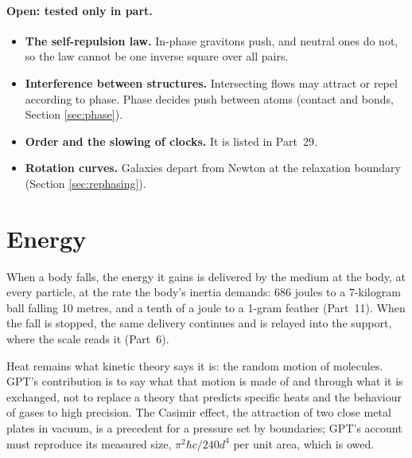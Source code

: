 \documentclass[11pt,a4paper]{article}
\begin{document}
\paragraph{Open: tested only in part.}
\begin{itemize}
\item \textbf{The self-repulsion law.} In-phase gravitons push, and neutral ones do not, so the law cannot be one inverse square over all pairs. 
\item \textbf{Interference between structures.} Intersecting flows may attract or repel according to phase. Phase decides push between atoms (contact and bonds, Section \ref{sec:phase}). 
\item \textbf{Order and the slowing of clocks.}  It is listed in Part~29.
\item \textbf{Rotation curves.} Galaxies depart from Newton at the relaxation boundary (Section \ref{sec:rephasing}). 
\end{itemize}

\section{Energy}
\label{sec:energy}

 When a body falls, the energy it gains is delivered by the medium at the body, at every particle, at the rate the body's inertia demands: 686 joules to a 7-kilogram ball falling 10 metres, and a tenth of a joule to a 1-gram feather (Part~11). When the fall is stopped, the same delivery continues and is relayed into the support, where the scale reads it (Part~6).

Heat remains what kinetic theory says it is: the random motion of molecules. GPT's contribution is to say what that motion is made of and through what it is exchanged, not to replace a theory that predicts specific heats and the behaviour of gases to high precision. The Casimir effect, the attraction of two close metal plates in vacuum, is a precedent for a pressure set by boundaries; GPT's account must reproduce its measured size, $\pi^2\hbar c/240d^4$ per unit area, which is owed.
\end{document}
